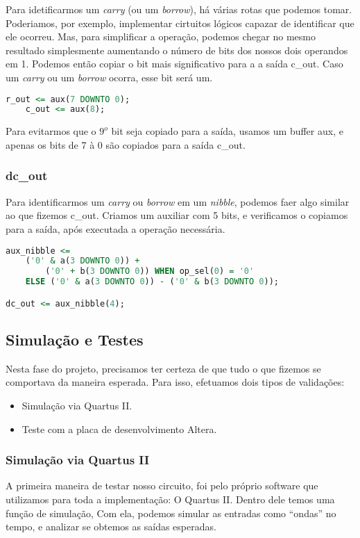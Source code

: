 \documentclass{article}
\begin{document}
Para idetificarmos um \textit{carry} (ou um \textit{borrow}), há várias rotas que podemos tomar. Poderiamos, por exemplo, implementar cirtuitos lógicos capazar de identificar que ele ocorreu. Mas, para simplificar a operação, podemos chegar no mesmo resultado simplesmente aumentando o número de bits dos nossos dois operandos em 1. Podemos então copiar o bit mais significativo para a a saída c\_out. Caso um \textit{carry} ou um \textit{borrow} ocorra, esse bit será um.

\begin{lstlisting}[language=VHDL]
    r_out <= aux(7 DOWNTO 0);
    c_out <= aux(8);
\end{lstlisting}

Para evitarmos que o $9^o$ bit seja copiado para a saída, usamos um buffer aux, e apenas os bits de 7 à 0 são copiados para a saída c\_out.

\subsubsection{dc\_out}

Para identificarmos um \textit{carry} ou \textit{borrow} em um \textit{nibble}, podemos faer algo similar ao que fizemos c\_out. Criamos um auxiliar com 5 bits, e verificamos o copiamos para a saída, após executada a operação necessária.

\begin{lstlisting}[language=VHDL]
aux_nibble <=
    ('0' & a(3 DOWNTO 0)) +
        ('0' + b(3 DOWNTO 0)) WHEN op_sel(0) = '0' 
	ELSE ('0' & a(3 DOWNTO 0)) - ('0' & b(3 DOWNTO 0));

dc_out <= aux_nibble(4);
\end{lstlisting}

\subsection{Simulação e Testes}

Nesta fase do projeto, precisamos ter certeza de que tudo o que fizemos se comportava da maneira esperada. Para isso, efetuamos dois tipos de validações:

\begin{itemize}
    \item Simulação via Quartus II.
    \item Teste com a placa de desenvolvimento Altera.
\end{itemize}

\subsubsection{Simulação via Quartus II}
A primeira maneira de testar nosso circuito, foi pelo próprio software que utilizamos para toda a implementação: O Quartus II. Dentro dele temos uma função de simulação, Com ela, podemos simular as entradas como ``ondas'' no tempo, e analizar se obtemos as saídas esperadas.
\end{document}
